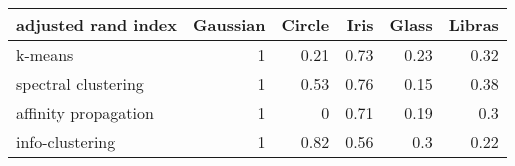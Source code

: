 \begin{tabular}{lrrrrr}
\hline
 adjusted rand index   &   Gaussian &   Circle &   Iris &   Glass &   Libras \\
\hline
 k-means               &          1 &     0.21 &   0.73 &    0.23 &     0.32 \\
 spectral clustering   &          1 &     0.53 &   0.76 &    0.15 &     0.38 \\
 affinity propagation  &          1 &     0    &   0.71 &    0.19 &     0.3  \\
 info-clustering       &          1 &     0.82 &   0.56 &    0.3  &     0.22 \\
\hline
\end{tabular}